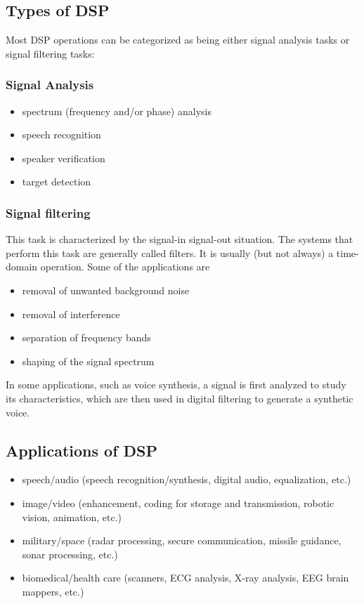 \documentclass{article}
\begin{document}
\subsection{Types of DSP}
Most DSP operations can be categorized as being either signal analysis
tasks or signal filtering tasks:

\subsubsection{Signal Analysis}
\begin{itemize}
    \item spectrum (frequency and/or phase) analysis
    \item speech recognition
    \item speaker verification
    \item target detection
\end{itemize}

\subsubsection{Signal filtering}
This task is characterized by the signal-in signal-out
situation. The systems that perform this task are generally called filters.
It is usually (but not always) a time-domain operation. Some of the applications are

\begin{itemize}
    \item removal of unwanted background noise
    \item removal of interference
    \item separation of frequency bands
    \item shaping of the signal spectrum
    
\end{itemize}
In some applications, such as voice synthesis, a signal is first analyzed
to study its characteristics, which are then used in digital filtering to
generate a synthetic voice.

\subsection{Applications of DSP}
\begin{itemize}
    \item speech/audio (speech recognition/synthesis, digital audio, equalization, etc.)
    \item image/video (enhancement, coding for storage and transmission,
    robotic vision, animation, etc.)
    \item military/space (radar processing, secure communication, missile guidance, sonar processing, etc.)
    \item biomedical/health care (scanners, ECG analysis, X-ray analysis, EEG
    brain mappers, etc.)
\end{itemize}
\begin{tabularx}{\textwidth}{|X|X|X|}

\end{tabularx}
\end{document}
